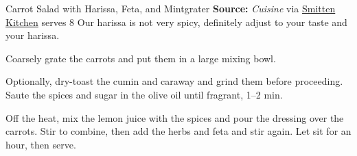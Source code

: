 \begin{recipe}[]{Carrot Salad with Harissa, Feta, and Mint}{grater \hfill} %
 {\textbf{Source:} \textit{Cuisine} via \href{https://smittenkitchen.com/2010/05/carrot-salad-with-harissa-feta-and-mint/}{Smitten Kitchen} \hfill serves 8}
 \freeform Our harissa is not very spicy, definitely adjust to your taste and your harissa.

 Coarsely grate the carrots and put them in a large mixing bowl.

 Optionally, dry-toast the cumin and caraway and grind them before proceeding. Saute the spices and sugar in the olive oil until fragrant, 1--2 min.

 Off the heat, mix the lemon juice with the spices and pour the dressing over the carrots. Stir to combine, then add the herbs and feta and stir again. Let sit for an hour, then serve.
\end{recipe}

